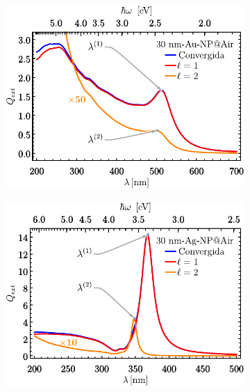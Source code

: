 	\begin{figure}[h!]\centering
	\begin{subfigure}{.01\linewidth}\caption{}\label{sfig:Q-ext-Au}\vspace{3.75cm}\end{subfigure}\hspace*{-.5em}
	\begin{subfigure}{.45\linewidth}\centering \includegraphics[scale=.75 ]{2-Resultados/figs/5-JCAu/Au_Qexr}\end{subfigure}
	\begin{subfigure}{.01\linewidth}\caption{}\label{sfig:Q-ext-Ag}\vspace{3.75cm}\end{subfigure}\hspace*{-.5em}
	\begin{subfigure}{.45\linewidth}\centering \includegraphics[scale=.75 ]{2-Resultados/figs/6-JCAg/Ag_Qexr.pdf}\end{subfigure}\vspace*{-.5em}

\end{figure}

